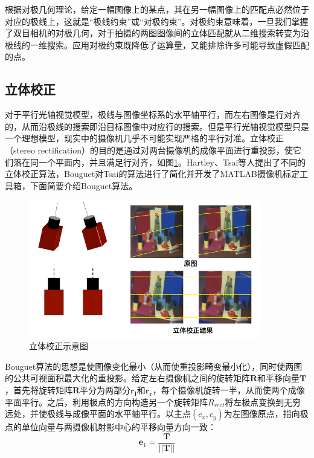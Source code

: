 根据对极几何理论，给定一幅图像上的某点，其在另一幅图像上的匹配点必然位于对应的极线上，这就是“极线约束”或“对极约束”。对极约束意味着，一旦我们掌握了双目相机的对极几何，对于拍摄的两图图像间的立体匹配就从二维搜索转变为沿极线的一维搜索。应用对极约束既降低了运算量，又能排除许多可能导致虚假匹配的点。


\subsection{立体校正}
对于平行光轴视觉模型，极线与图像坐标系的水平轴平行，而左右图像是行对齐的，从而沿极线的搜索即沿目标图像中对应行的搜索。但是平行光轴视觉模型只是一个理想模型，现实中的摄像机几乎不可能实现严格的平行对准。立体校正（stereo rectification）的目的是通过对两台摄像机的成像平面进行重投影，使它们落在同一个平面内，并且满足行对齐，如图\ref{fig:2_3_stereo_rectification}。Hartley\cite{hartley1999theory}、Tsai\cite{tsai1987versatile}等人提出了不同的立体校正算法，Bouguet对Tsai的算法进行了简化并开发了MATLAB摄像机标定工具箱，下面简要介绍Bouguet算法。

\begin{figure}[!htb] %
	\centering
	\includegraphics[width=4in]{figures/2_3_stereo_rectification}
	\caption{立体校正示意图}\label{fig:2_3_stereo_rectification}
\end{figure}

Bouguet算法的思想是使图像变化最小（从而使重投影畸变最小化），同时使两图的公共可视面积最大化的重投影\cite{bradski2008learning}。给定左右摄像机之间的旋转矩阵$\mathbf{R}$和平移向量$\mathbf{T}$，首先将旋转矩阵$\mathbf{R}$平分为两部分$\mathbf{r_l}$和$\mathbf{r_r}$，每个摄像机旋转一半，从而使两个成像平面平行。之后，利用极点的方向构造另一个旋转矩阵$R_{rect}$将左极点变换到无穷远处，并使极线与成像平面的水平轴平行。以主点$(c_x, c_y)$为左图像原点，指向极点的单位向量与两摄像机射影中心的平移向量方向一致：
%
\begin{equation}\label{eq:2_3_7}
\mathbf{e}_1 = \frac{\mathbf{T}}{||\mathbf{T}||}
\end{equation}

